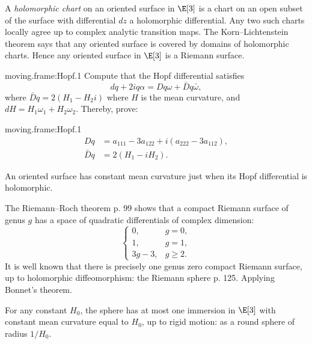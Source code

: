 A \emph{holomorphic chart} on an oriented surface in \(\E[3]\) is a chart on an open subset of the surface with differential \(dz\) a holomorphic differential.
Any two such charts locally agree up to complex analytic transition maps.
The Korn--Lichtenstein theorem says that any oriented surface is covered by domains of holomorphic charts.
Hence any oriented surface in \(\E[3]\) is a Riemann surface.
\begin{problem}{moving.frame:Hopf.1}
Compute that the Hopf differential satisfies
\[
dq+2iq\alpha = Dq \omega +  \bar{D}q \bar\omega,
\]
where
\(
\bar{D}q=
2(H_1-H_2i)
\)
where \(H\) is the mean curvature, and \(dH=H_1\omega_1+H_2\omega_2\).
Thereby, prove:
\end{problem}
\begin{answer}{moving.frame:Hopf.1}
\begin{align*}
Dq&=a_{111}-3a_{122}+i(a_{222}-3a_{112}),\\
\bar{D}q&=2(H_1-iH_2).
\end{align*}
\end{answer}
\begin{theorem}
An oriented surface has constant mean curvature just when its Hopf differential is holomorphic.
\end{theorem}
The Riemann--Roch theorem \cite{Griffiths:1989} p. 99 shows that a compact Riemann surface of genus \(g\) has a space of quadratic differentials of complex dimension: 
\[
\begin{cases}
0,&g=0,\\
1,&g=1,\\ 
3g-3,&g\ge 2.
\end{cases}
\]
It is well known that there is precisely one genus zero compact Riemann surface, up to holomorphic diffeomorphism: the Riemann sphere \cite{Griffiths:1989} p. 125.
Applying Bonnet's theorem.
\begin{corollary}
For any constant \(H_0\), the sphere has at most one immersion in \(\E[3]\) with constant mean curvature equal to \(H_0\), up to rigid motion: as a round sphere of radius \(1/H_0\).
\end{corollary}

